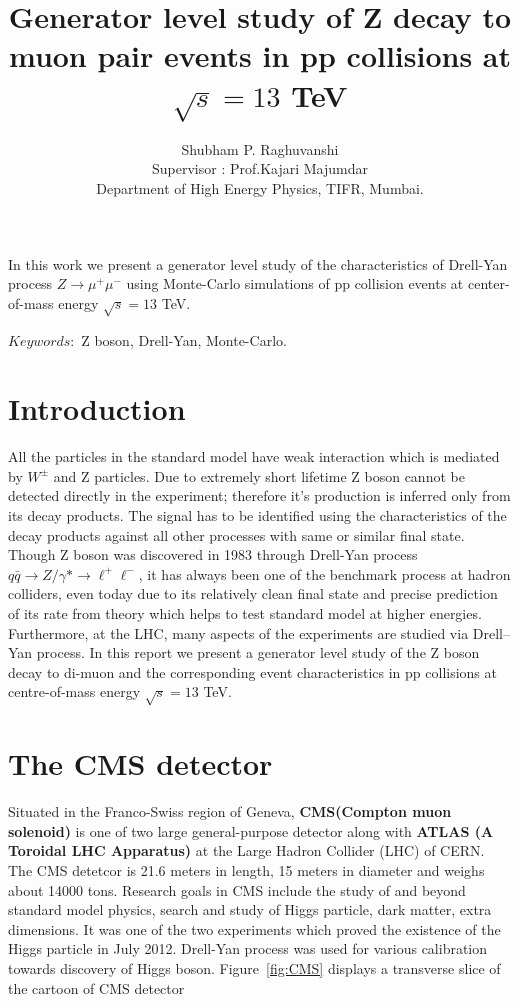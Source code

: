 \documentclass[12pt,a4paper]{article}		%
\title{\textbf { Generator level study of Z decay to muon pair events in pp collisions at $\sqrt{s}=13$ TeV}}
\author{Shubham P. Raghuvanshi\\Supervisor : Prof.Kajari Majumdar\\Department of High Energy Physics, TIFR, Mumbai.}
\begin{document}
\maketitle


In this work we present a generator level study of the characteristics of Drell-Yan process $Z \to \mu^+\mu^-$ using Monte-Carlo simulations of pp collision events at center-of-mass energy $\sqrt{s}=13$ TeV.


$Keywords :$ Z boson, Drell-Yan, Monte-Carlo.  

\newpage

\tableofcontents
\newpage
\section{Introduction}

All the particles in the standard model have weak interaction which is mediated by $W^\pm $ and Z particles. Due to extremely short lifetime Z boson cannot be detected directly in the experiment; therefore it's production is inferred only from its decay products. The signal has to be identified using the characteristics of the decay products against all other processes with same or similar final state. Though Z boson was discovered in 1983 through Drell-Yan process $q\bar{q} \to Z/\gamma* \to \ell^+\ell^-$, it has always been one of the benchmark  process at hadron colliders, even today due to its relatively clean final state and precise prediction of its rate from theory which helps to test standard model at higher energies. Furthermore, at the LHC, many aspects of the experiments are studied via Drell--Yan process. 
In this report we present a generator level study of the Z boson decay to di-muon and the corresponding event characteristics in pp collisions at centre-of-mass energy $\sqrt{s}=13$ TeV.


\section{The CMS detector}


Situated in the Franco-Swiss region of Geneva, \textbf{CMS(Compton muon solenoid)} is one  of two large general-purpose detector along with \textbf{ATLAS (A Toroidal
LHC Apparatus)} at the Large Hadron Collider (LHC) of CERN. The CMS detetcor is 21.6 meters in length, 15 meters in diameter and weighs about 14000 tons. Research goals in CMS include the study of and beyond standard model physics, search and study of Higgs particle, dark matter, extra dimensions. It was one of the two experiments which proved the existence of the Higgs particle in July 2012. Drell-Yan process was used for various calibration towards discovery of Higgs boson.  Figure~\ref{fig:CMS} displays a transverse slice of the cartoon of CMS detector
\end{document}
